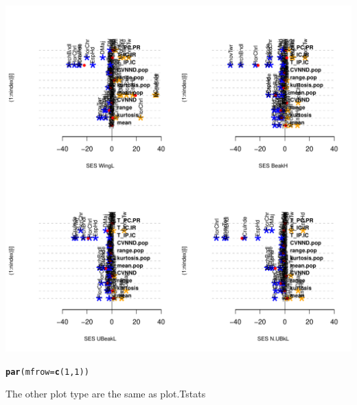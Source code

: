 \documentclass[12pt]{article}\usepackage[]{graphicx}\usepackage[]{color}
\makeatletter
\def\maxwidth{ %
  \ifdim\Gin@nat@width>\linewidth
    \linewidth
  \else
    \Gin@nat@width
  \fi
}
\newcommand{\hlnum}[1]{\textcolor[rgb]{0.686,0.059,0.569}{#1}}%
\newcommand{\hlstd}[1]{\textcolor[rgb]{0.345,0.345,0.345}{#1}}%
\newcommand{\hlkwc}[1]{\textcolor[rgb]{0.333,0.667,0.333}{#1}}%
\newcommand{\hlkwd}[1]{\textcolor[rgb]{0.737,0.353,0.396}{\textbf{#1}}}%
\newenvironment{kframe}{%
 \def\at@end@of@kframe{}%
 \ifinner\ifhmode%
  \def\at@end@of@kframe{\end{minipage}}%
  \begin{minipage}{\columnwidth}%
 \fi\fi%
 \def\FrameCommand##1{\hskip\@totalleftmargin \hskip-\fboxsep
 \colorbox{shadecolor}{##1}\hskip-\fboxsep
     \hskip-\linewidth \hskip-\@totalleftmargin \hskip\columnwidth}%
 \MakeFramed {\advance\hsize-\width
   \@totalleftmargin\z@ \linewidth\hsize
   \@setminipage}}%
 {\par\unskip\endMakeFramed%
 \at@end@of@kframe}
\newenvironment{knitrout}{}{} %
\makeatother
\begin{document}
\begin{knitrout}
\includegraphics[width=\maxwidth]{figure/unnamed-chunk-422} 
\begin{kframe}\begin{alltt}
\hlkwd{par}\hlstd{(}\hlkwc{mfrow}\hlstd{=}\hlkwd{c}\hlstd{(}\hlnum{1}\hlstd{,}\hlnum{1}\hlstd{))}
\end{alltt}
\end{kframe}
\end{knitrout}

The other plot type are the same as plot.Tstats
\end{document}
